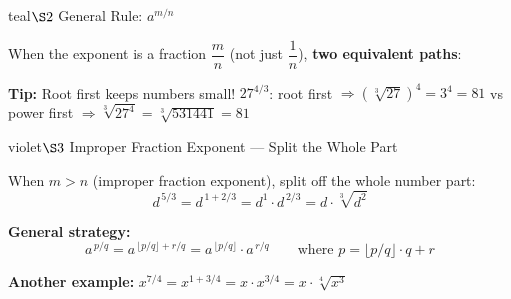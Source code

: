 \documentclass[12pt]{article}
\begin{document}
\begin{ideabox}{teal}{$\S2$ \quad General Rule: $a^{m/n}$}

When the exponent is a fraction $\dfrac{m}{n}$ (not just $\dfrac{1}{n}$), \textbf{two equivalent paths}:

\vspace{6pt}
\begin{center}
\end{center}

\vspace{4pt}
\textbf{Tip:} Root first keeps numbers small!
\hspace{1em}
$27^{4/3}$: root first $\Rightarrow (\sqrt[3]{27})^4 = 3^4 = 81$
\hspace{0.5em} vs \hspace{0.5em}
power first $\Rightarrow \sqrt[3]{27^4} = \sqrt[3]{531441} = 81$ \checkmark

\end{ideabox}

\vspace{8pt}

\begin{ideabox}{violet}{$\S3$ \quad Improper Fraction Exponent --- Split the Whole Part}

When $m > n$ (improper fraction exponent), split off the whole number part:
\[
d^{\,5/3}
= d^{\,1 + 2/3}
= d^1 \cdot d^{\,2/3}
= d \cdot \sqrt[3]{d^2}
\]

\textbf{General strategy:}
\[
a^{\,p/q} = a^{\,\lfloor p/q \rfloor + r/q}
= a^{\,\lfloor p/q \rfloor} \cdot a^{\,r/q}
\qquad\text{where } p = \lfloor p/q\rfloor \cdot q + r
\]

\textbf{Another example:}\;
$x^{7/4} = x^{1+3/4} = x \cdot x^{3/4} = x\cdot\sqrt[4]{x^3}$

\end{ideabox}
\end{document}

